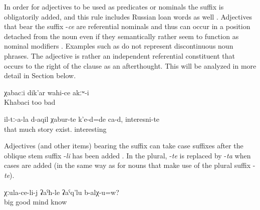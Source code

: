 In order for adjectives to be used as predicates  or nominals  the suffix is obligatorily added, and this rule includes Russian loan words as well . Adjectives that bear the suffix -\textit{ce} are referential nominals and thus can occur in a position detached from the noun even if they semantically rather seem to function as nominal modifiers . Examples such as  do not represent discontinuous noun phrases. The adjective is rather an independent referential constituent that occurs to the right of the clause as an afterthought. This will be analyzed in more detail in Section  below.

\begin{exe}
	\ex	\label{ex:Khabaci (name) was also not bad minor}
	\gll	χabacːi	dik'ar	wahi-ce	akːʷ-i\\
		Khabaci	too	bad	\\
	\glt	{}

	\ex	\label{ex:About them there were, are many stories, interesting (ones) minor@19c}
	\gll	il-tː-a-la	d-aqil	χabur-te	k'e-d=de	ca-d,	interesni-te\\
		that	much	story	exist.		interesting\\
	\glt	{}

\end{exe}

Adjectives (and other items) bearing the suffix can take case suffixes after the oblique stem suffix -\textit{li} has been added . In the plural, -\textit{te} is replaced by -\textit{ta} when cases are added (in the same way as for nouns that make use of the plural suffix -\textit{te}). 

\begin{exe}
	\ex	\label{ex:Does an older (person) know it better minor}
	\gll	χːula-ce-li-j	ʡaˁħ-le	ʡaˁq'lu	b-alχ-u=w?\\
		big	good	mind	know\\
	\glt	{}
\end{exe}

